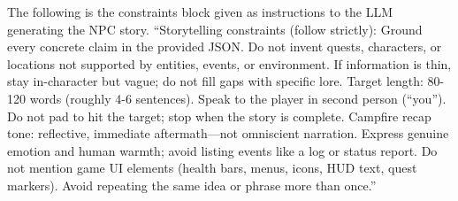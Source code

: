 \documentclass{article}
\begin{document}
%
The following is the constraints block given as instructions to the LLM generating the NPC story.
    ``Storytelling constraints (follow strictly):
    Ground every concrete claim in the provided JSON. Do not invent quests, characters,
      or locations not supported by entities, events, or environment.
    If information is thin, stay in-character but vague; do not fill gaps with specific lore.
    Target length: 80-120 words (roughly 4-6 sentences). Speak to the player in second
      person (``you''). Do not pad to hit the target; stop when the story is complete.
    Campfire recap tone: reflective, immediate aftermath—not omniscient narration.
    Express genuine emotion and human warmth; avoid listing events like a log or status report.
    Do not mention game UI elements (health bars, menus, icons, HUD text, quest markers).
    Avoid repeating the same idea or phrase more than once.''
\end{document}
